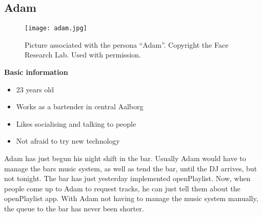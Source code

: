 \subsection{Adam}
\begin{figure}[hbtp]
  \centering
  \texttt{[image: adam.jpg]}
  \caption[Persona \enquote{Adam}.]{Picture associated with the persona \enquote{Adam}. Copyright the Face Research Lab. Used with permission.}\label{fig:adam}
\end{figure}
\noindent\textbf{Basic information}

\begin{itemize}
\item 23 years old
\item Works as a bartender in central Aalborg
\item Likes socialising and talking to people
\item Not afraid to try new technology
\end{itemize}

Adam has just begun his night shift in the bar. Usually Adam would have to manage the bars music system, as well as tend the bar, until the DJ arrives, but not tonight. The bar has just yesterday implemented openPlaylist. Now, when people come up to Adam to request tracks, he can just tell them about the openPlaylist app. With Adam not having to manage the music system manually, the queue to the bar has never been shorter. 